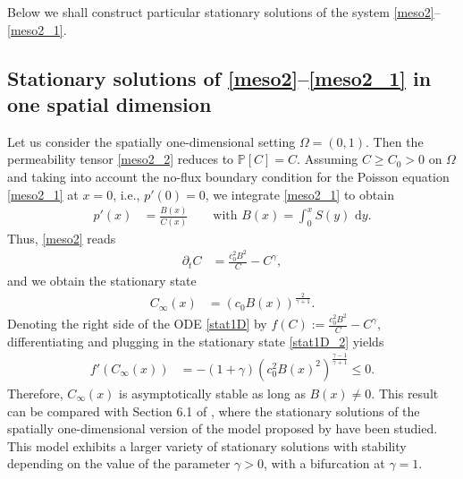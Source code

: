 \documentclass{article}
\numberwithin{equation}{section}
\def\d{\,\mathrm{d}}
\begin{document}
Below we shall construct particular stationary solutions of the system \eqref{meso2}--\eqref{meso2_1}.



\subsection{Stationary solutions of \eqref{meso2}--\eqref{meso2_1} in one spatial dimension}
Let us consider the spatially one-dimensional setting $\Omega=(0,1)$.
Then the permeability tensor \eqref{meso2_2} reduces to $\mathbb{P}[C]=C$.
Assuming $C \geq C_0 >0$ on $\Omega$ and taking into account the no-flux boundary condition for the Poisson equation \eqref{meso2_1} at $x=0$, i.e., $p'(0)=0$,
we integrate \eqref{meso2_1} to obtain
\begin{align*}
   p'(x)&= \frac{B(x)}{C(x)} \qquad\mbox{with } B(x) = \int_0^x S(y)\, \d y.
\end{align*}
Thus, \eqref{meso2} reads
\begin{align}\label{stat1D}
   \partial_t C&=\frac{c_0^2 B^2}{C}-C^\gamma,
\end{align}
and we obtain the stationary state 
\begin{align}\label{stat1D_2}
   C_\infty(x)&=(c_0 B(x))^{\frac{2}{\gamma+1}}.
\end{align}
Denoting the right side of the ODE \eqref{stat1D} by $f(C):=\frac{c_0^2 B^2}{C}-C^\gamma$, differentiating and plugging in the stationary state \eqref{stat1D_2} yields
\begin{align*}
   f'(C_\infty(x))&=-(1+\gamma)(c_0^2B(x)^2)^{\frac{\gamma-1}{\gamma+1}} \leq 0.
\end{align*}
Therefore, $C_\infty(x)$ is asymptotically stable as long as $B(x)\neq 0$.
This result can be compared with Section 6.1 of \cite{haskovec2015mathematical}, where the stationary solutions of the spatially one-dimensional
version of the model proposed by \cite{hu2013optimization} have been studied. This model exhibits a larger variety of stationary solutions with stability
depending on the value of the parameter $\gamma>0$, with a bifurcation at $\gamma=1$.


\end{document}
